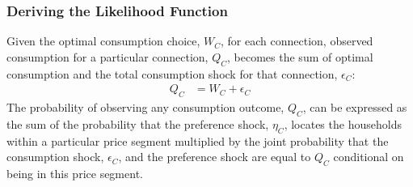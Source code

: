\documentclass[12pt]{article}
\begin{document}
\subsubsection{Deriving the Likelihood Function}

Given the optimal consumption choice, $W_C$, for each connection, observed consumption for a particular connection, $Q_C$, becomes the sum of optimal consumption and the total consumption shock for that connection, $\epsilon_C$:
\begin{align}\label{equation:observeddemand}
Q_C &= W_C + \epsilon_C
\end{align}
The probability of observing any consumption outcome, $Q_C$, can be expressed as the sum of the probability that the preference shock, $\eta_C$, locates the households within a particular price segment multiplied by the joint probability that the consumption shock, $\epsilon_C$, and the preference shock are equal to $Q_C$ conditional on being in this price segment.
\end{document}
